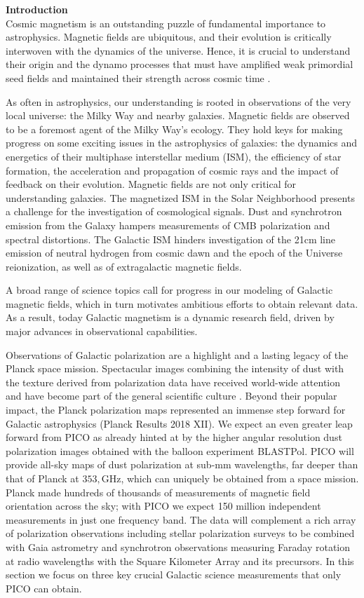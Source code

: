 \documentclass[PICOReport.tex]{subfiles}
\begin{document}
{\bf Introduction}\\
Cosmic magnetism is an outstanding puzzle of fundamental importance to astrophysics. Magnetic fields are ubiquitous, and their evolution is critically interwoven with the dynamics of the universe. Hence, it is crucial to understand
their origin and the dynamo processes that must have amplified weak  primordial seed fields 
and maintained their strength across cosmic time \citep{Brandenburg2005}. 

As often in astrophysics, our understanding is rooted in 
observations of the very local universe: the Milky Way and nearby galaxies. Magnetic fields are observed to be a foremost agent of the 
Milky Way's ecology. They hold keys for making progress on some exciting issues in the astrophysics of galaxies: the dynamics and 
energetics of their multiphase interstellar medium (ISM), the efficiency of star formation, the acceleration and propagation of cosmic rays and the 
impact of feedback on their evolution. Magnetic fields are not only critical for understanding galaxies. 
The magnetized ISM in the Solar Neighborhood presents a challenge for the investigation of cosmological signals. 
Dust and synchrotron emission from the Galaxy hampers measurements of CMB polarization and spectral distortions. The Galactic ISM
hinders investigation of the 21cm line emission of neutral hydrogen from cosmic dawn and the epoch of the Universe reionization, as well as of 
extragalactic magnetic fields.  

A broad range of science topics call for progress in our modeling of Galactic magnetic fields, which in turn 
motivates ambitious efforts to obtain relevant data. 
As a result, today Galactic magnetism is a dynamic research field, driven by major advances in observational capabilities.

Observations of Galactic polarization are a highlight and a lasting legacy of the Planck space mission. 
Spectacular images combining the intensity of dust with the texture derived from polarization data 
have received world-wide attention and have become part of the general scientific culture \citep{PlanckI2015}. 
Beyond their popular impact, the Planck polarization maps represented an 
immense step forward for Galactic astrophysics (Planck Results 2018 XII). 
We expect an even greater leap forward from PICO as 
already hinted at by the higher angular resolution dust polarization images obtained with the balloon experiment BLASTPol.  
PICO will provide all-sky maps of dust polarization at sub-mm wavelengths, far deeper than that 
of Planck at $353,$GHz, which can uniquely be obtained from a space mission. Planck made hundreds of thousands of measurements of magnetic field orientation across the sky; with PICO we expect 150 million independent measurements in just one frequency band.
The data will complement a rich array of polarization observations including stellar polarization surveys to be 
combined with Gaia astrometry and synchrotron observations measuring Faraday rotation at radio wavelengths 
with the Square Kilometer Array and its precursors. 
In this section we focus on three key crucial Galactic science measurements that only PICO can obtain.
\end{document}
